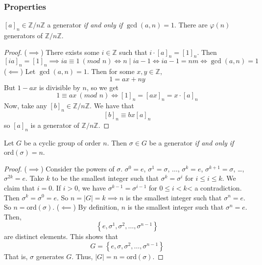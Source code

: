 \documentclass{report}
\newcommand{\Z}{\mathbb{Z}}
\newcommand{\modclass}[1]{\Z/{#1}\Z}
\newcommand{\ord}{\text{ord}}
\newcommand{\proposition}[1]{\begin{tcolorbox}[title=\textit{Proposition}]{#1}\end{tcolorbox}}
\renewcommand{\mod}[1]{\ (\textit{mod } {#1})}
\begin{document}
\subsubsection{Properties}
\proposition {
    $[a]_n \in \modclass{n}$ a generator \textit{if and only if} $\gcd(a, n) = 1$. There are $\varphi(n)$ generators
    of $\modclass{n}$.
}
\begin{proof}
    ($\implies$) There exists some $i \in \Z$ such that $i \cdot [a]_n = [1]_n$. Then
    \[[ia]_n = [1]_n \implies ia \equiv 1 \mod{n} \iff n \mid ia - 1 \iff ia - 1 = nm \iff \gcd(a, n) = 1\]
    ($\impliedby$)
    Let $\gcd(a, n) = 1$. Then for some $x, y \in \Z$,
    \[1 = ax + ny\]
    But $1 - ax$ is divisible by $n$, so we get
    \[1 \equiv ax \mod{n} \iff [1]_n = [ax]_n = x \cdot [a]_n\]
    Now, take any $[b]_n \in \modclass{n}$. We have that 
    \[[b]_n \equiv bx [a]_n\]
    so $[a]_n$ is a generator of $\modclass{n}$.
\end{proof}

\proposition {
    Let $G$ be a cyclic group of order $n$. Then $\sigma \in G$ be a generator \textit{if and only if}
    $\ord(\sigma) = n$.
}
\begin{proof}
    ($\implies$)
    Consider the powers of $\sigma$. $\sigma^0 = e$, $\sigma^1 = \sigma$, $\ldots$, $\sigma^k = e$,
    $\sigma^{k + 1} = \sigma$, \ldots, $\sigma^{2k} = e$. Take $k$ to be the smallest integer such that
    $\sigma^k = \sigma^i$ for $i \leq i \leq k$. We claim that $i = 0$. 
    \newline
    \newline
    If $i > 0$, we have $\sigma^{k - 1} = \sigma^{i - 1}$ for $0 \leq i < k$< a contradiction. Then
    $\sigma^k = \sigma^0 = e$. So $n = |G| = k \implies n$ is the smallest integer such that
    $\sigma^n = e$. So $n = \ord(\sigma)$.
    \newline
    \newline
    ($\impliedby$) By definition, $n$ is the smallest integer such that $\sigma^n = e$. Then,
    \[\left\{ e, \sigma^1, \sigma^2, \ldots, \sigma^{n - 1} \right\}\]
    are distinct elements. This shows that 
    \[G = \left\{ e, \sigma, \sigma^2, \ldots, \sigma^{n - 1} \right\}\]
    That is, $\sigma$ generates $G$. Thus, $|G| = n = \ord(\sigma)$.
\end{proof}
\end{document}
